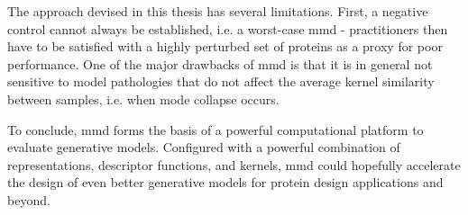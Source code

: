 The approach devised in this thesis has several limitations. First, a negative
control cannot always be established, i.e. a worst-case \acrshort{mmd} - practitioners then
have to be satisfied with a highly perturbed set of proteins as a proxy for poor
performance. One of the major drawbacks of \acrshort{mmd} is that it is in general not
sensitive to model pathologies that do not affect the average kernel similarity
between samples, i.e. when mode collapse occurs.

To conclude, \acrshort{mmd} forms the basis of a powerful computational platform to
evaluate generative models. Configured with a powerful combination of
representations, descriptor functions, and kernels, \acrshort{mmd} could hopefully
accelerate the design of even better generative models for protein design
applications and beyond.
